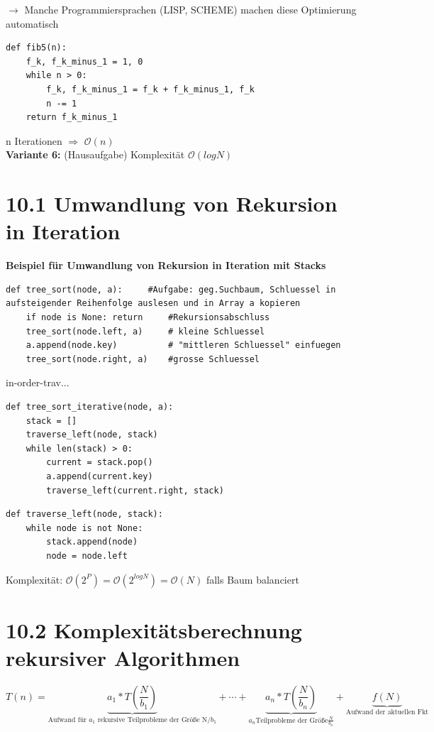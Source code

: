 \documentclass[11pt, fleqn]{scrreprt}
\newcommand{\bigO}[0]{\mathcal{O}}
\begin{document}
$\rightarrow$ Manche Programmiersprachen (LISP, SCHEME) machen diese Optimierung automatisch\\

\begin{verbatim}
def fib5(n):
    f_k, f_k_minus_1 = 1, 0
    while n > 0:
        f_k, f_k_minus_1 = f_k + f_k_minus_1, f_k
        n -= 1
    return f_k_minus_1
\end{verbatim}
n Iterationen $\Rightarrow$ $\bigO{}(n)$\\

\textbf{Variante 6:} (Hausaufgabe) Komplexität $\bigO{}(log N)$ \\

\section*{10.1 Umwandlung von Rekursion in Iteration}
\textbf{Beispiel für Umwandlung von Rekursion in Iteration mit Stacks}
\begin{verbatim}
def tree_sort(node, a):     #Aufgabe: geg.Suchbaum, Schluessel in aufsteigender Reihenfolge auslesen und in Array a kopieren
    if node is None: return     #Rekursionsabschluss
    tree_sort(node.left, a)     # kleine Schluessel
    a.append(node.key)          # "mittleren Schluessel" einfuegen
    tree_sort(node.right, a)    #grosse Schluessel
\end{verbatim}
in-order-trav...

\begin{verbatim}
def tree_sort_iterative(node, a):
    stack = []
    traverse_left(node, stack)
    while len(stack) > 0:
        current = stack.pop()
        a.append(current.key)
        traverse_left(current.right, stack)
\end{verbatim}
\begin{verbatim}
def traverse_left(node, stack):
    while node is not None:
        stack.append(node)
        node = node.left
\end{verbatim}

Komplexität: $\bigO{}(2^P) = \bigO{}(2^{log N}) = \bigO{}(N)$ falls Baum balanciert \\

\section*{10.2 Komplexitätsberechnung rekursiver Algorithmen}
\[ T(n) = \underbrace{a_1 * T\left(\frac{N}{b_1}\right)}_{\text{Aufwand für $a_1$ rekursive Teilprobleme der Größe N/$b_1$}} + \cdots + \underbrace{a_n* T\left(\frac{N}{b_n}\right)}_{a_n \text{Teilprobleme der Größe} \frac{N}{b_n}} + \underbrace{f(N)}_{\text{Aufwand der aktuellen Fkt}}\]
\end{document}

